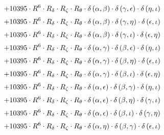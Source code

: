 \begin{subequations}
\begin{gather}
 \\[0.2em] \notag 		 + 10395 \cdot R^{6} \cdot R_{\delta{}} \cdot R_{\zeta{}} \cdot R_{\theta{}} \cdot \delta{}\left(\alpha{}, \beta{}\right) \cdot \delta{}\left(\gamma{}, \epsilon{}\right) \cdot \delta{}\left(\eta{}, \iota{}\right) 
 \\[0.2em] \notag 		 + 10395 \cdot R^{6} \cdot R_{\delta{}} \cdot R_{\zeta{}} \cdot R_{\theta{}} \cdot \delta{}\left(\alpha{}, \beta{}\right) \cdot \delta{}\left(\gamma{}, \eta{}\right) \cdot \delta{}\left(\epsilon{}, \iota{}\right) 
 \\[0.2em] \notag 		 + 10395 \cdot R^{6} \cdot R_{\delta{}} \cdot R_{\zeta{}} \cdot R_{\theta{}} \cdot \delta{}\left(\alpha{}, \beta{}\right) \cdot \delta{}\left(\gamma{}, \iota{}\right) \cdot \delta{}\left(\epsilon{}, \eta{}\right) 
 \\[0.2em] \notag 		 + 10395 \cdot R^{6} \cdot R_{\delta{}} \cdot R_{\zeta{}} \cdot R_{\theta{}} \cdot \delta{}\left(\alpha{}, \gamma{}\right) \cdot \delta{}\left(\beta{}, \epsilon{}\right) \cdot \delta{}\left(\eta{}, \iota{}\right) 
 \\[0.2em] \notag 		 + 10395 \cdot R^{6} \cdot R_{\delta{}} \cdot R_{\zeta{}} \cdot R_{\theta{}} \cdot \delta{}\left(\alpha{}, \gamma{}\right) \cdot \delta{}\left(\beta{}, \eta{}\right) \cdot \delta{}\left(\epsilon{}, \iota{}\right) 
 \\[0.2em] \notag 		 + 10395 \cdot R^{6} \cdot R_{\delta{}} \cdot R_{\zeta{}} \cdot R_{\theta{}} \cdot \delta{}\left(\alpha{}, \gamma{}\right) \cdot \delta{}\left(\beta{}, \iota{}\right) \cdot \delta{}\left(\epsilon{}, \eta{}\right) 
 \\[0.2em] \notag 		 + 10395 \cdot R^{6} \cdot R_{\delta{}} \cdot R_{\zeta{}} \cdot R_{\theta{}} \cdot \delta{}\left(\alpha{}, \epsilon{}\right) \cdot \delta{}\left(\beta{}, \gamma{}\right) \cdot \delta{}\left(\eta{}, \iota{}\right) 
 \\[0.2em] \notag 		 + 10395 \cdot R^{6} \cdot R_{\delta{}} \cdot R_{\zeta{}} \cdot R_{\theta{}} \cdot \delta{}\left(\alpha{}, \epsilon{}\right) \cdot \delta{}\left(\beta{}, \eta{}\right) \cdot \delta{}\left(\gamma{}, \iota{}\right) 
 \\[0.2em] \notag 		 + 10395 \cdot R^{6} \cdot R_{\delta{}} \cdot R_{\zeta{}} \cdot R_{\theta{}} \cdot \delta{}\left(\alpha{}, \epsilon{}\right) \cdot \delta{}\left(\beta{}, \iota{}\right) \cdot \delta{}\left(\gamma{}, \eta{}\right) 
 \\[0.2em] \notag 		 + 10395 \cdot R^{6} \cdot R_{\delta{}} \cdot R_{\zeta{}} \cdot R_{\theta{}} \cdot \delta{}\left(\alpha{}, \eta{}\right) \cdot \delta{}\left(\beta{}, \gamma{}\right) \cdot \delta{}\left(\epsilon{}, \iota{}\right) 

\end{gather}
\end{subequations}

